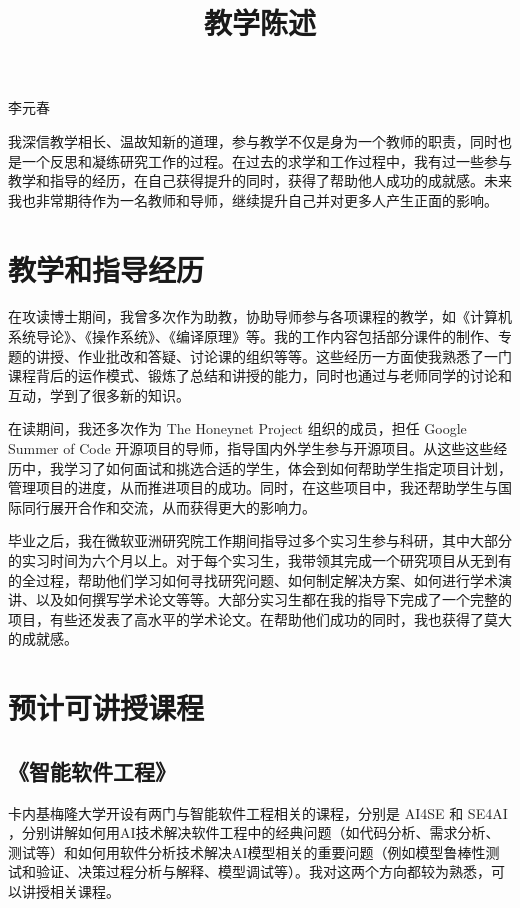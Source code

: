\documentclass[12pt]{article}
\begin{document}

\title{教学陈述}

\maketitle

\begin{center} {李元春} \end{center}


我深信教学相长、温故知新的道理，参与教学不仅是身为一个教师的职责，同时也是一个反思和凝练研究工作的过程。在过去的求学和工作过程中，我有过一些参与教学和指导的经历，在自己获得提升的同时，获得了帮助他人成功的成就感。未来我也非常期待作为一名教师和导师，继续提升自己并对更多人产生正面的影响。

\section{教学和指导经历}

在攻读博士期间，我曾多次作为助教，协助导师参与各项课程的教学，如《计算机系统导论》、《操作系统》、《编译原理》等。我的工作内容包括部分课件的制作、专题的讲授、作业批改和答疑、讨论课的组织等等。这些经历一方面使我熟悉了一门课程背后的运作模式、锻炼了总结和讲授的能力，同时也通过与老师同学的讨论和互动，学到了很多新的知识。

在读期间，我还多次作为 The Honeynet Project 组织的成员，担任 Google Summer of Code 开源项目的导师，指导国内外学生参与开源项目。从这些这些经历中，我学习了如何面试和挑选合适的学生，体会到如何帮助学生指定项目计划，管理项目的进度，从而推进项目的成功。同时，在这些项目中，我还帮助学生与国际同行展开合作和交流，从而获得更大的影响力。

毕业之后，我在微软亚洲研究院工作期间指导过多个实习生参与科研，其中大部分的实习时间为六个月以上。对于每个实习生，我带领其完成一个研究项目从无到有的全过程，帮助他们学习如何寻找研究问题、如何制定解决方案、如何进行学术演讲、以及如何撰写学术论文等等。大部分实习生都在我的指导下完成了一个完整的项目，有些还发表了高水平的学术论文。在帮助他们成功的同时，我也获得了莫大的成就感。


\section{预计可讲授课程}


\subsection{《智能软件工程》}
卡内基梅隆大学开设有两门与智能软件工程相关的课程，分别是 AI4SE \cite{cmu:ai4se} 和 SE4AI \cite{cmu:se4ai}，分别讲解如何用AI技术解决软件工程中的经典问题（如代码分析、需求分析、测试等）和如何用软件分析技术解决AI模型相关的重要问题（例如模型鲁棒性测试和验证、决策过程分析与解释、模型调试等）。我对这两个方向都较为熟悉，可以讲授相关课程。
\end{document}
